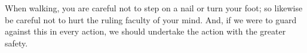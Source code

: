 When walking, you are careful not to step on a nail or turn your
foot; so likewise be careful not to hurt the ruling faculty of your
mind. And, if we were to guard against this in every action, we should
undertake the action with the greater safety. 
